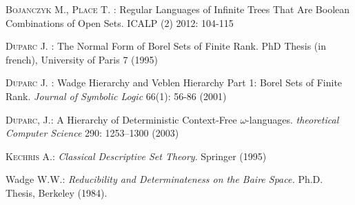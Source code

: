 \begin{thebibliography}{00}

\textsc{Bojanczyk} M., \textsc{Place} T. :  Regular Languages of Infinite Trees That Are Boolean Combinations of Open Sets. ICALP (2) 2012: 104-115

\textsc{Duparc} J. : The Normal Form of Borel Sets of Finite Rank. PhD Thesis (in french),  University of Paris 7 (1995)

\textsc{Duparc} J. : Wadge Hierarchy and Veblen Hierarchy Part 1: Borel Sets of Finite Rank. \textit{Journal of Symbolic Logic} 66(1): 56-86 (2001)


\textsc{Duparc}, J.: 
A Hierarchy of Deterministic Context-Free $\omega$-languages.
\textit{theoretical Computer Science} 290: 1253--1300 (2003)



\textsc{Kechris} A.: \emph{Classical Descriptive Set Theory}. Springer (1995)


{\sc Wadge} W.W.: {\em Reducibility and Determinateness on the Baire Space.}  Ph.D. Thesis, Berkeley (1984).

\end{thebibliography}
